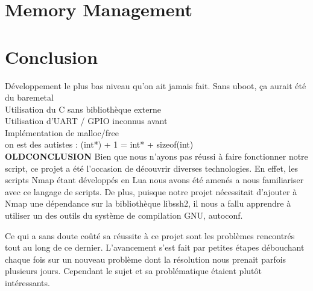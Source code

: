 \documentclass[frenchb]{article}
\begin{document}
\section{Memory Management}

\clearpage

\section*{Conclusion}

\noindent Développement le plus bas niveau qu'on ait jamais fait. Sans uboot, ça aurait été du baremetal\\
Utilisation du C sans bibliothèque externe\\
Utilisation d'UART / GPIO inconnus avant\\
Implémentation de malloc/free\\
on est des autistes : (int*) + 1 = int* + sizeof(int)\\


{\Large\textbf{OLDCONCLUSION}}
Bien que nous n'ayons pas réussi à faire fonctionner notre script, ce projet a été l'occasion de découvrir diverses technologies. En effet, les scripts Nmap étant développés en Lua nous avons été amenés a nous familiariser avec ce langage de scripts. De plus, puisque notre projet nécessitait d'ajouter à Nmap une dépendance sur la bibliothèque \textsf{libssh2}, il nous a fallu apprendre à utiliser un des outils du système de compilation GNU, \textsf{autoconf}. 

Ce qui a sans doute coûté sa réussite à ce projet sont les problèmes rencontrés tout au long de ce dernier. L'avancement s'est fait par petites étapes débouchant chaque fois sur un nouveau problème dont la résolution nous prenait parfois plusieurs jours. Cependant le sujet et sa problématique étaient plutôt intéressants.
\end{document}
